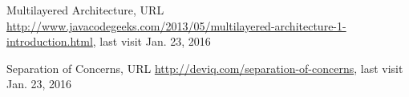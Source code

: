 \begin{thebibliography}{99}
 Multilayered Architecture, URL
\url{http://www.javacodegeeks.com/2013/05/multilayered-architecture-1-introduction.html}, last visit Jan. 23, 2016

 Separation of Concerns, URL
\url{http://deviq.com/separation-of-concerns}, last visit Jan. 23, 2016




\end{thebibliography}
